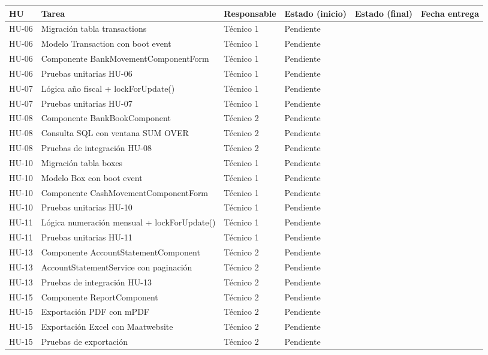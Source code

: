 \documentclass[stu]{apa7}
\begin{document}
\begin{longtable}{|C{0.8cm}|L{3.5cm}|L{2.5cm}|C{2cm}|C{2cm}|C{2cm}|}
\hline
{}
\textbf{HU} & \textbf{Tarea} & \textbf{Responsable} & \textbf{Estado (inicio)} & \textbf{Estado (final)} & \textbf{Fecha entrega} \\
\hline
HU-06 & Migración tabla transactions & Técnico 1 & Pendiente & & \\
\hline
HU-06 & Modelo Transaction con boot event & Técnico 1 & Pendiente & & \\
\hline
HU-06 & Componente BankMovementComponentForm & Técnico 1 & Pendiente & & \\
\hline
HU-06 & Pruebas unitarias HU-06 & Técnico 1 & Pendiente & & \\
\hline
HU-07 & Lógica año fiscal + lockForUpdate() & Técnico 1 & Pendiente & & \\
\hline
HU-07 & Pruebas unitarias HU-07 & Técnico 1 & Pendiente & & \\
\hline
HU-08 & Componente BankBookComponent & Técnico 2 & Pendiente & & \\
\hline
HU-08 & Consulta SQL con ventana SUM OVER & Técnico 2 & Pendiente & & \\
\hline
HU-08 & Pruebas de integración HU-08 & Técnico 2 & Pendiente & & \\
\hline
HU-10 & Migración tabla boxes & Técnico 1 & Pendiente & & \\
\hline
HU-10 & Modelo Box con boot event & Técnico 1 & Pendiente & & \\
\hline
HU-10 & Componente CashMovementComponentForm & Técnico 1 & Pendiente & & \\
\hline
HU-10 & Pruebas unitarias HU-10 & Técnico 1 & Pendiente & & \\
\hline
HU-11 & Lógica numeración mensual + lockForUpdate() & Técnico 1 & Pendiente & & \\
\hline
HU-11 & Pruebas unitarias HU-11 & Técnico 1 & Pendiente & & \\
\hline
HU-13 & Componente AccountStatementComponent & Técnico 2 & Pendiente & & \\
\hline
HU-13 & AccountStatementService con paginación & Técnico 2 & Pendiente & & \\
\hline
HU-13 & Pruebas de integración HU-13 & Técnico 2 & Pendiente & & \\
\hline
HU-15 & Componente ReportComponent & Técnico 2 & Pendiente & & \\
\hline
HU-15 & Exportación PDF con mPDF & Técnico 2 & Pendiente & & \\
\hline
HU-15 & Exportación Excel con Maatwebsite & Técnico 2 & Pendiente & & \\
\hline
HU-15 & Pruebas de exportación & Técnico 2 & Pendiente & & \\
\hline
\end{longtable}
\end{document}
